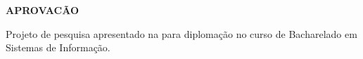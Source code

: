 \begin{folhadeaprovacao}
\begin{center}
\textbf{APROVA{\C C}\~AO}
\end{center}

\noindent Projeto de pesquisa apresentado na {\INSTITUICAO} para diploma{\c c}\~ao no curso de Bacharelado em Sistemas de Informa{\c c}\~ao.

\end{folhadeaprovacao}
